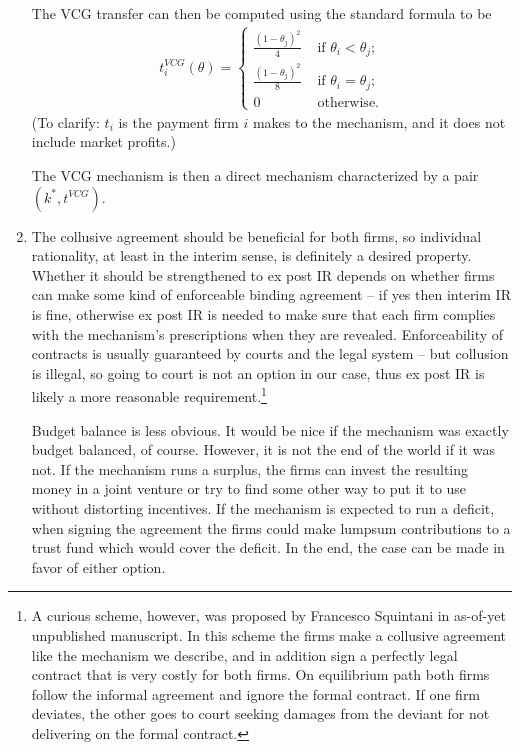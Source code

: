 \documentclass[a4paper]{article}
\begin{document}
\begin{enumerate}
	The VCG transfer can then be computed using the standard formula to be
	\begin{align*}
		t_i^{VCG}(\theta) =
		\begin{cases}
			\frac{(1-\theta_j)^2}{4} & \text{ if } \theta_i < \theta_j;
			\\
			\frac{(1-\theta_j)^2}{8}  & \text{ if } \theta_i = \theta_j;
			\\
			0 & \text{ otherwise.}
		\end{cases}
	\end{align*}
	(To clarify: $t_i$ is the payment firm $i$ makes to the mechanism, and it does not include market profits.)
	
	The VCG mechanism is then a direct mechanism characterized by a pair $(k^*,t^{VCG})$.
	
	\item 
	The collusive agreement should be beneficial for both firms, so individual rationality, at least in the interim sense, is definitely a desired property. Whether it should be strengthened to ex post IR depends on whether firms can make some kind of enforceable binding agreement -- if yes then interim IR is fine, otherwise ex post IR is needed to make sure that each firm complies with the mechanism's prescriptions when they are revealed. Enforceability of contracts is usually guaranteed by courts and the legal system -- but collusion is illegal, so going to court is not an option in our case, thus ex post IR is likely a more reasonable requirement.\footnote{A curious scheme, however, was proposed by Francesco Squintani in as-of-yet unpublished manuscript. In this scheme the firms make a collusive agreement like the mechanism we describe, and in addition sign a perfectly legal contract that is very costly for both firms. On equilibrium path both firms follow the informal agreement and ignore the formal contract. If one firm deviates, the other goes to court seeking damages from the deviant for not delivering on the formal contract.}
	
	Budget balance is less obvious. It would be nice if the mechanism was exactly budget balanced, of course. However, it is not the end of the world if it was not. If the mechanism runs a surplus, the firms can invest the resulting money in a joint venture or try to find some other way to put it to use without distorting incentives. If the mechanism is expected to run a deficit, when signing the agreement the firms could make lumpsum contributions to a trust fund which would cover the deficit. In the end, the case can be made in favor of either option.
	

\end{enumerate}
\end{document}
